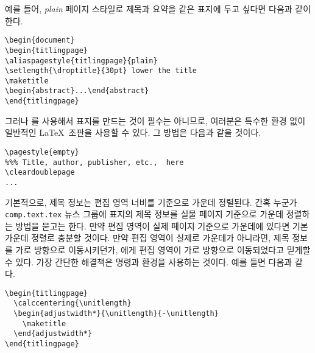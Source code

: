 \documentclass[10pt,a4paper]{oblivoir}
\begin{document}
예를 들어, \textsl{plain} 페이지 스타일로 제목과 요약을 같은 표지에 두고 싶다면
다음과 같이 한다.
\begin{verbatim}
\begin{document}
\begin{titlingpage}
\aliaspagestyle{titlingpage}{plain}
\setlength{\droptitle}{30pt} lower the title
\maketitle
\begin{abstract}...\end{abstract}
\end{titlingpage}
\end{verbatim}

그러나 를 사용해서 표지를 만드는 것이 필수는 아니므로,
여러분은 특수한 환경 없이 일반적인 \LaTeX\ 조판을 사용할 수 있다.
그 방법은 다음과 같을 것이다.
\begin{verbatim}
\pagestyle{empty}
%%% Title, author, publisher, etc.,  here
\cleardoublepage
...
\end{verbatim}

기본적으로, 제목 정보는 편집 영역 너비를 기준으로 가운데 정렬된다.
간혹 누군가 \texttt{comp.text.tex} 뉴스 그룹에 표지의 제목 정보를 실물 페이지
기준으로 가운데 정렬하는 방법을 묻고는 한다.
만약 편집 영역이 실제 페이지 기준으로 가운데에 있다면 기본 가운데 정렬로 충분할
것이다.
만약 편집 영역이 실제로 가운데가 아니라면, 제목 정보를 가로 방향으로
이동시키던가, \cmd{\maketitle}에게 편집 영역이 가로 방향으로 이동되었다고
믿게할 수 있다.
가장 간단한 해결책은 \cmd{\calccentering} 명령과  환경을
사용하는 것이다.
예를 들면 다음과 같다.
\begin{verbatim}
\begin{titlingpage}
  \calccentering{\unitlength}
  \begin{adjustwidth*}{\unitlength}{-\unitlength}
    \maketitle
  \end{adjustwidth*}
\end{titlingpage}
\end{verbatim}

\begin{tcolorbox}
\cmd{\title} \cmd{\thetitle}\\
\cmd{\author} \cmd{\theauthor}\\
\cmd{\date} \cmd{\thedate}
\end{tcolorbox}
\end{document}
